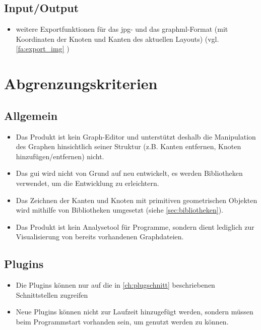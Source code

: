 \subsection{Input/Output}
  \begin{itemize}
    \item weitere Exportfunktionen für das \gls{jpg}- und das \gls{graphml}-Format (mit Koordinaten der Knoten und Kanten des aktuellen Layouts) (vgl. \ref{fa:export_img} )
  \end{itemize}
  
\section{Abgrenzungskriterien}

\subsection{Allgemein}
  \begin{itemize}
    \item Das Produkt ist kein Graph-Editor und unterstützt deshalb die Manipulation des Graphen hinsichtlich seiner Struktur (z.B. Kanten entfernen, Knoten hinzufügen/entfernen) nicht.
    \item Das \gls{gui} wird nicht von Grund auf neu entwickelt, es werden Bibliotheken verwendet, um die Entwicklung zu erleichtern.
    \item Das Zeichnen der Kanten und Knoten mit primitiven geometrischen Objekten wird mithilfe von Bibliotheken umgesetzt (siehe \autoref{sec:bibliotheken}).
    \item Das Produkt ist kein Analysetool für Programme, sondern dient lediglich zur Visualisierung von bereits vorhandenen Graphdateien.
  \end{itemize}
\subsection{Plugins}
  \begin{itemize}
    \item Die Plugins können nur auf die in \autoref{ch:plugschnitt} beschriebenen Schnittstellen zugreifen
    \item Neue Plugins können nicht zur Laufzeit hinzugefügt werden, sondern müssen beim Programmstart vorhanden sein, um genutzt werden zu können.
  \end{itemize}
